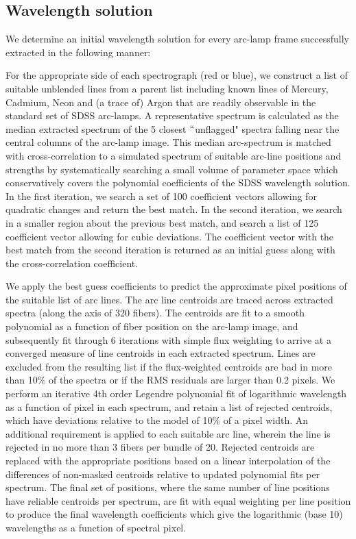 \documentclass[12pt,preprint]{aastex}
\begin{document}
\subsection{Wavelength solution}

We determine an initial wavelength solution for every arc-lamp frame
successfully extracted in the following manner:

For the appropriate side of each spectrograph (red or blue), we 
construct a list of suitable unblended lines from a parent list including
known lines of Mercury, Cadmium, Neon and (a trace of) Argon 
that are readily observable in the standard set of SDSS arc-lamps. 
A representative spectrum is calculated as the median extracted spectrum
of the 5 closest $``$unflagged" spectra falling near the central columns 
of the arc-lamp image.  This median arc-spectrum is matched with 
cross-correlation to a simulated spectrum of suitable arc-line positions and 
strengths by systematically searching a small volume of 
parameter space which conservatively covers
the polynomial coefficients of the SDSS wavelength solution.
In the first iteration, we search a set of 
100 coefficient vectors allowing for quadratic changes and return 
the best match.  In the second iteration, we search in a smaller region
about the previous best match, and search a list of 125 coefficient vector
allowing for cubic deviations.  The coefficient vector with the best
match from the second iteration is returned as an initial guess along with
the cross-correlation coefficient.  

We apply the best guess coefficients to predict the approximate pixel 
positions of the suitable list of arc lines.  The arc line centroids
are traced across extracted spectra (along the axis of 320 fibers).
The centroids are fit to a smooth polynomial as a function of fiber
position on the arc-lamp image, and subsequently fit through 6 iterations
with simple flux weighting to arrive at a converged measure of line 
centroids in each extracted spectrum.  Lines are excluded from the resulting
list if the flux-weighted centroids are bad in more than 10\% of the
spectra or if the RMS residuals are larger than 0.2 pixels.
We perform an iterative 4th order Legendre polynomial fit of 
logarithmic wavelength as a function of pixel in each spectrum, 
and retain a list of rejected centroids, 
which have deviations relative to the model of
10\% of a pixel width.  An additional requirement is applied to each
suitable arc line, wherein the line is rejected in no more than 3 fibers
per bundle of 20.  Rejected centroids are replaced with the appropriate
positions based on a linear interpolation of the differences of non-masked
centroids relative to updated polynomial fits per spectrum.
The final set of positions, where the same number of line positions have
reliable centroids per spectrum, are fit with equal weighting per line
position to produce the final wavelength
coefficients which give the logarithmic (base 10) wavelengths as a function
of spectral pixel.
\end{document}
